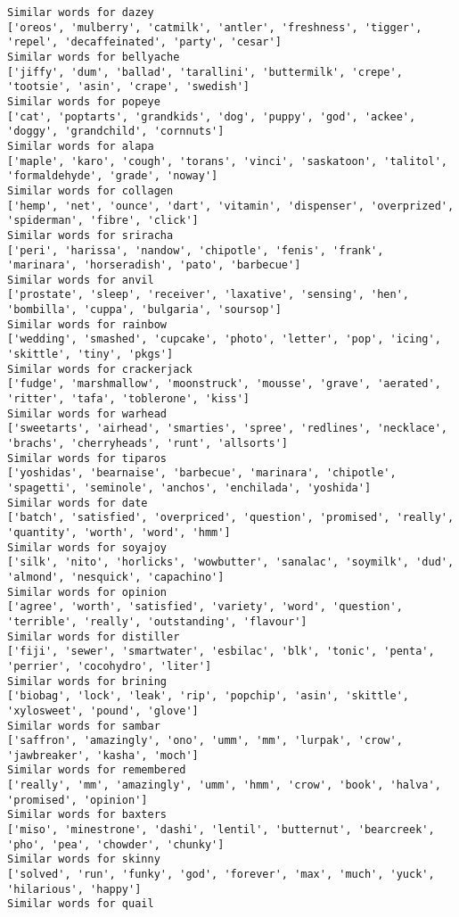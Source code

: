 \documentclass[11pt]{article}
\begin{document}
\begin{Verbatim}[commandchars=\\\{\}]
Similar words for dazey
['oreos', 'mulberry', 'catmilk', 'antler', 'freshness', 'tigger', 'repel', 'decaffeinated', 'party', 'cesar']
Similar words for bellyache
['jiffy', 'dum', 'ballad', 'tarallini', 'buttermilk', 'crepe', 'tootsie', 'asin', 'crape', 'swedish']
Similar words for popeye
['cat', 'poptarts', 'grandkids', 'dog', 'puppy', 'god', 'ackee', 'doggy', 'grandchild', 'cornnuts']
Similar words for alapa
['maple', 'karo', 'cough', 'torans', 'vinci', 'saskatoon', 'talitol', 'formaldehyde', 'grade', 'noway']
Similar words for collagen
['hemp', 'net', 'ounce', 'dart', 'vitamin', 'dispenser', 'overprized', 'spiderman', 'fibre', 'click']
Similar words for sriracha
['peri', 'harissa', 'nandow', 'chipotle', 'fenis', 'frank', 'marinara', 'horseradish', 'pato', 'barbecue']
Similar words for anvil
['prostate', 'sleep', 'receiver', 'laxative', 'sensing', 'hen', 'bombilla', 'cuppa', 'bulgaria', 'soursop']
Similar words for rainbow
['wedding', 'smashed', 'cupcake', 'photo', 'letter', 'pop', 'icing', 'skittle', 'tiny', 'pkgs']
Similar words for crackerjack
['fudge', 'marshmallow', 'moonstruck', 'mousse', 'grave', 'aerated', 'ritter', 'tafa', 'toblerone', 'kiss']
Similar words for warhead
['sweetarts', 'airhead', 'smarties', 'spree', 'redlines', 'necklace', 'brachs', 'cherryheads', 'runt', 'allsorts']
Similar words for tiparos
['yoshidas', 'bearnaise', 'barbecue', 'marinara', 'chipotle', 'spagetti', 'seminole', 'anchos', 'enchilada', 'yoshida']
Similar words for date
['batch', 'satisfied', 'overpriced', 'question', 'promised', 'really', 'quantity', 'worth', 'word', 'hmm']
Similar words for soyajoy
['silk', 'nito', 'horlicks', 'wowbutter', 'sanalac', 'soymilk', 'dud', 'almond', 'nesquick', 'capachino']
Similar words for opinion
['agree', 'worth', 'satisfied', 'variety', 'word', 'question', 'terrible', 'really', 'outstanding', 'flavour']
Similar words for distiller
['fiji', 'sewer', 'smartwater', 'esbilac', 'blk', 'tonic', 'penta', 'perrier', 'cocohydro', 'liter']
Similar words for brining
['biobag', 'lock', 'leak', 'rip', 'popchip', 'asin', 'skittle', 'xylosweet', 'pound', 'glove']
Similar words for sambar
['saffron', 'amazingly', 'ono', 'umm', 'mm', 'lurpak', 'crow', 'jawbreaker', 'kasha', 'moch']
Similar words for remembered
['really', 'mm', 'amazingly', 'umm', 'hmm', 'crow', 'book', 'halva', 'promised', 'opinion']
Similar words for baxters
['miso', 'minestrone', 'dashi', 'lentil', 'butternut', 'bearcreek', 'pho', 'pea', 'chowder', 'chunky']
Similar words for skinny
['solved', 'run', 'funky', 'god', 'forever', 'max', 'much', 'yuck', 'hilarious', 'happy']
Similar words for quail

\end{Verbatim}
\end{document}
